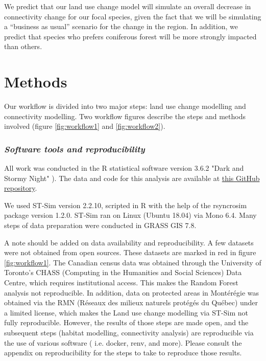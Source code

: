 We predict that our land use change model will simulate an overall decrease in connectivity change for our focal species, given the fact that we will be simulating a “business as usual” scenario for the change in the region. In addition, we predict that species who prefers coniferous forest will be more strongly impacted than others.\\

\section{Methods}

Our workflow is divided into two major steps: land use change modelling and connectivity modelling. Two workflow figures describe the steps and methods involved (figure \ref{fig:workflow1} and \ref{fig:workflow2}). \\

\subsubsection*{\textit{Software tools and reproducibility}}

All work was conducted in the R statistical software version 3.6.2 "Dark and Stormy Night" \citep[see][]{R}). The data and code for this analysis are available at \href{https://github.com/VLucet/landchange-connectivity-Montérégie}{this GitHub repository}.

We used ST-Sim version 2.2.10, scripted in R with the help of the rsyncrosim package version 1.2.0. ST-Sim ran on Linux (Ubuntu 18.04) via Mono 6.4. Many steps of data preparation were conducted in GRASS GIS 7.8.

A note should be added on data availability and reproducibility. A few datasets were not obtained from open sources. These datasets are marked in red in figure \ref{fig:workflow1}. The Canadian census data was obtained through the University of Toronto's CHASS (Computing in the Humanities and Social Sciences) Data Centre, which requires institutional access. This makes the Random Forest analysis not reproducible. In addition, data on protected areas in Montérégie was obtained  via the RMN (Réseaux des milieux naturels protégés du Québec) under a limited license, which makes the Land use change modelling via ST-Sim not fully reproducible. However, the results of those steps are made open, and the subsequent steps (habitat modelling, connectivity analysis) are reproducible via the use of various software ( i.e. docker, renv, and more). Please consult the appendix on reproducibility for the steps to take to reproduce those results. \\ %

